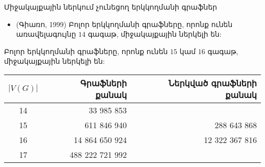 \begin{frame}[shrink]{Միջակայքային ներկում չունեցող երկկողմանի գրաֆներ}

\begin{itemize}
\item (Գիառո, 1999) Բոլոր երկկողմանի գրաֆները, որոնք ունեն առավելագույնը $14$ գագաթ, միջակայքային ներկելի են:
\end{itemize}

\begin{theorem}[3.4.4]
Բոլոր երկկողմանի գրաֆները, որոնք ունեն $15$ կամ $16$ գագաթ, միջակայքային ներկելի են:
\end{theorem}
\begin{table}[t]
\begin{center}
\begin{tabular}{|c|r|r|}
\hline
$|V(G)|$ & Գրաֆների քանակ & Ներկված գրաֆների քանակ \\
\hline
14 & 33 985 853 &  \\
\hline
15 & 611 846 940 & 288 643 868 \\
\hline
16 & 14 864 650 924 & 12 322 367 816 \\
\hline
17 & 488 222 721 992 &  \\
\hline
\end{tabular}
\end{center}
\end{table}

\end{frame}

